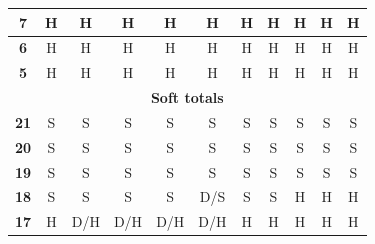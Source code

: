 \documentclass[conference]{IEEEtran}
\begin{document}
\begin{table}[htbp]
\begin{tabular}{|c|c|c|c|c|c|c|c|c|c|c|}
\textbf{7} & \cellcolor[HTML]{FE0000}H & \cellcolor[HTML]{FE0000}H & \cellcolor[HTML]{FE0000}H & \cellcolor[HTML]{FE0000}H & \cellcolor[HTML]{FE0000}H & \cellcolor[HTML]{FE0000}H & \cellcolor[HTML]{FE0000}H & \cellcolor[HTML]{FE0000}H & \cellcolor[HTML]{FE0000}H & \cellcolor[HTML]{FE0000}H \\ \hline
\textbf{6} & \cellcolor[HTML]{FE0000}H & \cellcolor[HTML]{FE0000}H & \cellcolor[HTML]{FE0000}H & \cellcolor[HTML]{FE0000}H & \cellcolor[HTML]{FE0000}H & \cellcolor[HTML]{FE0000}H & \cellcolor[HTML]{FE0000}H & \cellcolor[HTML]{FE0000}H & \cellcolor[HTML]{FE0000}H & \cellcolor[HTML]{FE0000}H \\ \hline
\textbf{5} & \cellcolor[HTML]{FE0000}H & \cellcolor[HTML]{FE0000}H & \cellcolor[HTML]{FE0000}H & \cellcolor[HTML]{FE0000}H & \cellcolor[HTML]{FE0000}H & \cellcolor[HTML]{FE0000}H & \cellcolor[HTML]{FE0000}H & \cellcolor[HTML]{FE0000}H & \cellcolor[HTML]{FE0000}H & \cellcolor[HTML]{FE0000}H \\ \hline
\multicolumn{11}{|c|}{\textbf{Soft totals}} \\ \hline
\textbf{21} & \cellcolor[HTML]{32CB00}S & \cellcolor[HTML]{32CB00}S & \cellcolor[HTML]{32CB00}S & \cellcolor[HTML]{32CB00}S & \cellcolor[HTML]{32CB00}S & \cellcolor[HTML]{32CB00}S & \cellcolor[HTML]{32CB00}S & \cellcolor[HTML]{32CB00}S & \cellcolor[HTML]{32CB00}S & \cellcolor[HTML]{32CB00}S \\ \hline
\textbf{20} & \cellcolor[HTML]{32CB00}S & \cellcolor[HTML]{32CB00}S & \cellcolor[HTML]{32CB00}S & \cellcolor[HTML]{32CB00}S & \cellcolor[HTML]{32CB00}S & \cellcolor[HTML]{32CB00}S & \cellcolor[HTML]{32CB00}S & \cellcolor[HTML]{32CB00}S & \cellcolor[HTML]{32CB00}S & \cellcolor[HTML]{32CB00}S \\ \hline
\textbf{19} & \cellcolor[HTML]{32CB00}S & \cellcolor[HTML]{32CB00}S & \cellcolor[HTML]{32CB00}S & \cellcolor[HTML]{32CB00}S & \cellcolor[HTML]{32CB00}S & \cellcolor[HTML]{32CB00}S & \cellcolor[HTML]{32CB00}S & \cellcolor[HTML]{32CB00}S & \cellcolor[HTML]{32CB00}S & \cellcolor[HTML]{32CB00}S \\ \hline
\textbf{18} & \cellcolor[HTML]{32CB00}S & \cellcolor[HTML]{32CB00}S & \cellcolor[HTML]{32CB00}S & \cellcolor[HTML]{32CB00}S & \cellcolor[HTML]{FFC702}D/S & \cellcolor[HTML]{32CB00}S & \cellcolor[HTML]{32CB00}S & \cellcolor[HTML]{FE0000}H & \cellcolor[HTML]{FE0000}H & \cellcolor[HTML]{FE0000}H \\ \hline
\textbf{17} & \cellcolor[HTML]{FE0000}H & \cellcolor[HTML]{FFC702}D/H & \cellcolor[HTML]{FFC702}D/H & \cellcolor[HTML]{FFC702}D/H & \cellcolor[HTML]{FFC702}D/H & \cellcolor[HTML]{FE0000}H & \cellcolor[HTML]{FE0000}H & \cellcolor[HTML]{FE0000}H & \cellcolor[HTML]{FE0000}H & \cellcolor[HTML]{FE0000}H \\ \hline

\end{tabular}
\end{table}
\end{document}
